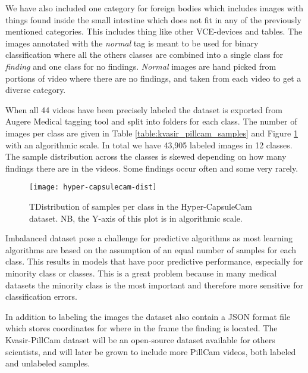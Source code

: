 \documentclass[thesis.tex]{subfiles}
\begin{document}
We have also included one category for foreign bodies which includes images with things found inside the small intestine which does not fit in any of the previously mentioned categories. This includes thing like other VCE-devices and tables. The images annotated with the \textit{normal} tag is meant to be used for binary classification where all the others classes are combined into a single class for \textit{finding} and one class for no findings. \textit{Normal} images are hand picked from portions of video where there are no findings, and taken from each video to get a diverse category.

When all 44 videos have been precisely labeled the dataset is exported from Augere Medical tagging tool and split into folders for each class. The number of images per class are given in Table \ref{table:kvasir_pillcam_samples} and Figure \ref{fig:hyper-capsulecam-dist} with an algorithmic scale. In total we have 43,905 labeled images in 12 classes. The sample distribution across the classes is skewed depending on how many findings there are in the videos. Some findings occur often and some very rarely. 

\begin{figure} %
  \begin{center}
    \texttt{[image: hyper-capsulecam-dist]}
    \caption[Distribution of samples per class in the Hyper-CapsuleCam dataset.]{TDistribution of samples per class in the Hyper-CapsuleCam dataset. NB, the Y-axis of this plot is in algorithmic scale.}
    \label{fig:hyper-capsulecam-dist}
  \end{center}
\end{figure}

Imbalanced dataset pose a challenge for predictive algorithms as most learning algorithms are based on the assumption of an equal number of samples for each class. This results in models that have poor predictive performance, especially for minority class or classes. This is a great problem because in many medical datasets the minority class is the most important and therefore more sensitive for classification errors.

In addition to labeling the images the dataset also contain a JSON format file which stores coordinates for where in the frame the finding is located. The Kvasir-PillCam dataset will be an open-source dataset available for others scientists, and will later be grown to include more PillCam videos, both labeled and unlabeled samples.
\end{document}
